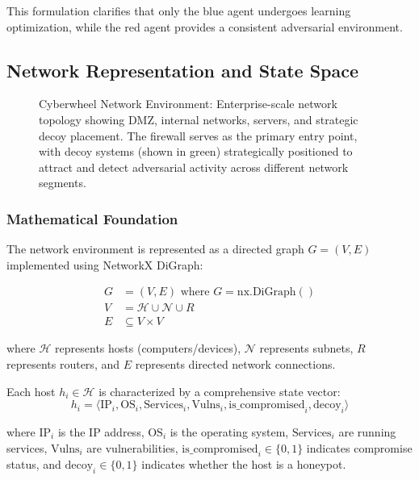 \documentclass[12pt,twoside]{article}
\theoremstyle{definition}
\theoremstyle{plain}
\begin{document}
This formulation clarifies that only the blue agent undergoes learning optimization, while the red agent provides a consistent adversarial environment.

\subsection{Network Representation and State Space}

\begin{figure}[H]
\centering
\caption{Cyberwheel Network Environment: Enterprise-scale network topology showing DMZ, internal networks, servers, and strategic decoy placement. The firewall serves as the primary entry point, with decoy systems (shown in green) strategically positioned to attract and detect adversarial activity across different network segments.}
\label{fig:network_environment}
\end{figure}


\subsubsection{Mathematical Foundation}
The network environment is represented as a directed graph $G = (V, E)$ implemented using NetworkX DiGraph:

\begin{align}
G &= (V, E) \text{ where } G = \text{nx.DiGraph}() \\
V &= \mathcal{H} \cup \mathcal{N} \cup R \\
E &\subseteq V \times V
\end{align}

where $\mathcal{H}$ represents hosts (computers/devices), $\mathcal{N}$ represents subnets, $R$ represents routers, and $E$ represents directed network connections.

Each host $h_i \in \mathcal{H}$ is characterized by a comprehensive state vector:
\begin{equation}
h_i = \langle \text{IP}_i, \text{OS}_i, \text{Services}_i, \text{Vulns}_i, \text{is\_compromised}_i, \text{decoy}_i \rangle
\end{equation}

where $\text{IP}_i$ is the IP address, $\text{OS}_i$ is the operating system, $\text{Services}_i$ are running services, $\text{Vulns}_i$ are vulnerabilities, $\text{is\_compromised}_i \in \{0,1\}$ indicates compromise status, and $\text{decoy}_i \in \{0,1\}$ indicates whether the host is a honeypot.
\end{document}
